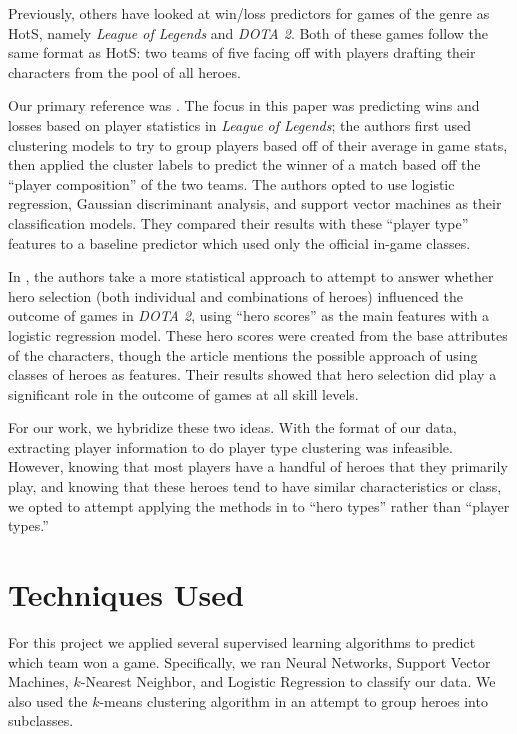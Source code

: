\documentclass[11pt,letterpaper]{article}
\begin{document}
Previously, others have looked at win/loss predictors for games of the genre as HotS, namely \emph{League of Legends} and \emph{DOTA 2}. Both of these games follow the same format as HotS: two teams of five facing off with players drafting their characters from the pool of all heroes. 

Our primary reference was \cite{ODP:15}. The focus in this paper was predicting wins and losses based on player statistics in \emph{League of Legends}; the authors first used clustering models to try to group players based off of their average in game stats, then applied the cluster labels to predict the winner of a match based off the ``player composition'' of the two teams. The authors opted to use logistic regression, Gaussian discriminant analysis, and support vector machines as their classification models. They compared their results with these ``player type'' features to a baseline predictor which used only the official in-game classes.

In \cite{PEA:13}, the authors take a more statistical approach to attempt to answer whether hero selection (both individual and combinations of heroes) influenced the outcome of games in \emph{DOTA 2}, using ``hero scores'' as the main features with a logistic regression model. These hero scores were created from the base attributes of the characters, though the article mentions the possible approach of using classes of heroes as features. Their results showed that hero selection did play a significant role in the outcome of games at all skill levels.

For our work, we hybridize these two ideas. With the format of our data, extracting player information to do player type clustering was infeasible. However, knowing that most players have a handful of heroes that they primarily play, and knowing that these heroes tend to have similar characteristics or class, we opted to attempt applying the methods in \cite{ODP:15} to ``hero types'' rather than ``player types.''

\section{Techniques Used}

For this project we applied several supervised learning algorithms to predict which team won a game. Specifically, we ran Neural Networks, Support Vector Machines, $k$-Nearest Neighbor, and Logistic Regression to classify our data. We also used the $k$-means clustering algorithm in an attempt to group heroes into subclasses.
\end{document}
